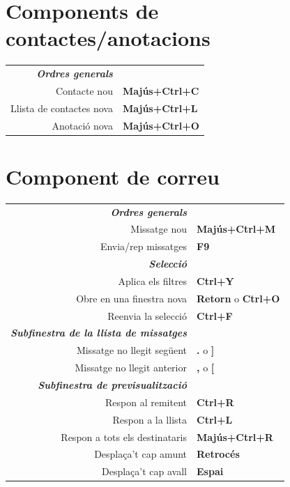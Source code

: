 \documentclass[12pt]{article}
\begin{document}
\begin{landscape}
\begin{center}
\begin{multicols}{2}
	\section*{Components de contactes/anotacions}
	\begin{tabular*}{4in}{rp{1.5in}}
		\textit{\textbf{Ordres generals}}	&					\\
		Contacte nou				& \textbf{Majús+Ctrl+C}			\\
		Llista de contactes nova			& \textbf{Majús+Ctrl+L}			\\
		Anotació nova				& \textbf{Majús+Ctrl+O}			\\
	\end{tabular*}
	\section*{Component de correu}
	\begin{tabular*}{4in}{rp{1.5in}}
		\textit{\textbf{Ordres generals}}	&					\\
		Missatge nou				& \textbf{Majús+Ctrl+M}			\\
		\vspace{1.5mm}
		Envia/rep missatges			& \textbf{F9}				\\
		\textit{\textbf{Selecció}}		&					\\
		Aplica els filtres				& \textbf{Ctrl+Y}			\\
		Obre en una finestra nova 			& \textbf{Retorn} o \textbf{Ctrl+O}	\\
		\vspace{1.5mm}
		Reenvia la selecció			& \textbf{Ctrl+F}			\\
		\textit{\textbf{Subfinestra de la llista de missatges}}	&					\\
		Missatge no llegit següent			& \textbf{.} o \textbf{]}		\\
		\vspace{1.5mm}
		Missatge no llegit anterior			& \textbf{,} o \textbf{[}		\\
		\textit{\textbf{Subfinestra de previsualització}}		&					\\
		Respon al remitent				& \textbf{Ctrl+R}			\\
		Respon a la llista				& \textbf{Ctrl+L}			\\
		Respon a tots els destinataris 		& \textbf{Majús+Ctrl+R}			\\
		Desplaça't cap amunt				& \textbf{Retrocés}			\\
		Desplaça't cap avall				& \textbf{Espai}			\\
	\end{tabular*}

\end{multicols}
\end{center}
\end{landscape}
\end{document}
